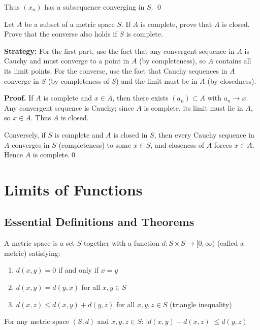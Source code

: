 Thus \((x_n)\) has a subsequence converging in \(S\). \qed
\medskip



\begin{problembox}
Let $A$ be a subset of a metric space $S$. If $A$ is complete, prove that $A$ is closed. Prove that the converse also holds if $S$ is complete.
\end{problembox}

\noindent\textbf{Strategy:} For the first part, use the fact that any convergent sequence in $A$ is Cauchy and must converge to a point in $A$ (by completeness), so $A$ contains all its limit points. For the converse, use the fact that Cauchy sequences in $A$ converge in $S$ (by completeness of $S$) and the limit must be in $A$ (by closedness).

\noindent\textbf{Proof.}
If $A$ is complete and $x\in\overline{A}$, then there exists $(a_n)\subset A$ with $a_n\to x$. Any convergent sequence is Cauchy; since $A$ is complete, its limit must lie in $A$, so $x\in A$. Thus $A$ is closed.

Conversely, if $S$ is complete and $A$ is closed in $S$, then every Cauchy sequence in $A$ converges in $S$ (completeness) to some $x\in S$, and closeness of $A$ forces $x\in A$. Hence $A$ is complete.\qed
\medskip

\section{Limits of Functions}

\subsection*{Essential Definitions and Theorems}

\begin{definition}
A metric space is a set $S$ together with a function $d: S \times S \to [0,\infty)$ (called a metric) satisfying:
\begin{enumerate}
\item $d(x,y) = 0$ if and only if $x = y$
\item $d(x,y) = d(y,x)$ for all $x,y \in S$
\item $d(x,z) \leq d(x,y) + d(y,z)$ for all $x,y,z \in S$ (triangle inequality)
\end{enumerate}
\end{definition}

\begin{theorem}
For any metric space $(S,d)$ and $x,y,z \in S$: $|d(x,y) - d(x,z)| \leq d(y,z)$
\end{theorem}

